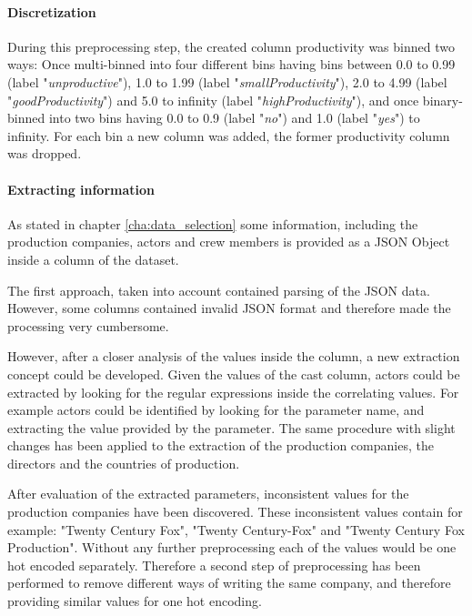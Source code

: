 \paragraph{Discretization}
During this preprocessing step, the created column productivity was binned two ways: Once multi-binned into four different bins having bins between 0.0 to 0.99 (label "\textit{unproductive}"), 1.0 to 1.99 (label "\textit{smallProductivity}"), 2.0 to 4.99 (label "\textit{goodProductivity}") and 5.0 to infinity (label "\textit{highProductivity}"), and once binary-binned into two bins having 0.0 to 0.9 (label "\textit{no}") and 1.0 (label "\textit{yes}") to infinity. For each bin a new column was added, the former productivity column was dropped.

\paragraph{Extracting information}
As stated in chapter \ref{cha:data_selection} some information, including the production companies, actors and crew members is provided as a JSON Object inside a column of the dataset. 

The first approach, taken into account contained parsing of the JSON data. However, some columns contained invalid JSON format and therefore made the processing very cumbersome.

However, after a closer analysis of the values inside the column, a new extraction concept could be developed. Given the values of the cast column, actors could be extracted by looking for the regular expressions inside the correlating values. For example actors could be identified by looking for the parameter name, and extracting the value provided by the parameter. The same procedure with slight changes has been applied to the extraction of the production companies, the directors and the countries of production.

After evaluation of the extracted parameters, inconsistent values for the production companies have been discovered. These inconsistent values contain for example: "Twenty Century Fox", "Twenty Century-Fox" and "Twenty Century Fox Production". Without any further preprocessing each of the values would be one hot encoded separately. Therefore a second step of preprocessing has been performed to remove different ways of writing the same company, and therefore providing similar values for one hot encoding.
 
